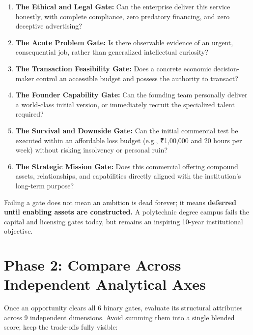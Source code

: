 \begin{enumerate}[leftmargin=14pt,itemsep=3pt,topsep=2pt]
  \item \textbf{The Ethical and Legal Gate:} Can the enterprise deliver this service honestly, with complete compliance, zero predatory financing, and zero deceptive advertising?
  \item \textbf{The Acute Problem Gate:} Is there observable evidence of an urgent, consequential job, rather than generalized intellectual curiosity?
  \item \textbf{The Transaction Feasibility Gate:} Does a concrete economic decision-maker control an accessible budget and possess the authority to transact?
  \item \textbf{The Founder Capability Gate:} Can the founding team personally deliver a world-class initial version, or immediately recruit the specialized talent required?
  \item \textbf{The Survival and Downside Gate:} Can the initial commercial test be executed within an affordable loss budget (e.g., ₹1,00,000 and 20 hours per week) without risking insolvency or personal ruin?
  \item \textbf{The Strategic Mission Gate:} Does this commercial offering compound assets, relationships, and capabilities directly aligned with the institution's long-term purpose?
\end{enumerate}

Failing a gate does not mean an ambition is dead forever; it means \textbf{deferred until enabling assets are constructed.} A polytechnic degree campus fails the capital and licensing gates today, but remains an inspiring 10-year institutional objective.

\section{Phase 2: Compare Across Independent Analytical Axes}

Once an opportunity clears all 6 binary gates, evaluate its structural attributes across 9 independent dimensions. Avoid summing them into a single blended score; keep the trade-offs fully visible:

